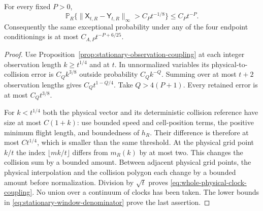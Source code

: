 \begin{lemma}
\label{lem:whole-physical-clock-coupling}
For every fixed $P>0$,
\begin{equation}\label{eq:whole-physical-clock-coupling}
 \mathbb P_R\{\|\mathsf X_{t,R}-\mathsf Y_{t,R}\|_\infty
                                  >C_Pt^{-1/8}\}\le C_Pt^{-P}.
\end{equation}
Consequently the same exceptional probability under any of the four
endpoint conditionings is at most $C_{A,P}t^{-P+6/25}$.
\end{lemma}
\begin{proof}
Use Proposition~\ref{prop:stationary-observation-coupling} at each
integer observation length $k\ge t^{1/4}$ and at $t$. In unnormalized
variables its physical-to-collision error is $C_Q k^{3/8}$ outside
probability $C_Q k^{-Q}$. Summing over at most $t+2$ observation
lengths gives $C_Qt^{1-Q/4}$. Take $Q>4(P+1)$.
Every retained error is at most $C_Qt^{3/8}$.

For $k<t^{1/4}$ both the physical vector and its deterministic collision
reference have size at most $C(1+k)$: use bounded speed and cell-position
terms, the positive minimum flight length, and boundedness of $h_R$.
Their difference is therefore at most $Ct^{1/4}$, which is smaller
than the same threshold. At the physical grid point $k/t$ the index
$\lfloor mk/t\rfloor$ differs from $m_R(k)$ by at most two.
This changes the collision sum by a bounded amount. Between adjacent
physical grid points, the physical interpolation and the collision
polygon each change by a bounded amount before normalization.
Division by $\sqrt t$ proves \eqref{eq:whole-physical-clock-coupling}.
No union over a continuum of clocks has been taken. The lower bounds
in \eqref{eq:stationary-window-denominator} prove the last assertion.
\end{proof}

